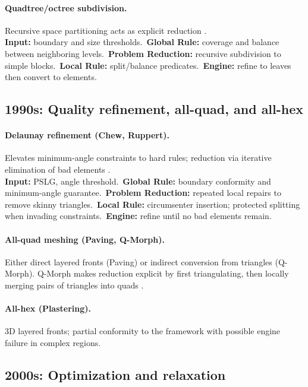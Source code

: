 \paragraph{Quadtree/octree subdivision.} Recursive space partitioning acts as explicit reduction \citep{yerry1983modified}.
\\\textbf{Input:} boundary and size thresholds.\
\textbf{Global Rule:} coverage and balance between neighboring levels.\
\textbf{Problem Reduction:} recursive subdivision to simple blocks.\
\textbf{Local Rule:} split/balance predicates.\
\textbf{Engine:} refine to leaves then convert to elements.

\subsection{1990s: Quality refinement, all-quad, and all-hex}
\paragraph{Delaunay refinement (Chew, Ruppert).} Elevates minimum-angle constraints to hard rules; reduction via iterative elimination of bad elements \citep{ruppert1995delaunay}.
\\\textbf{Input:} PSLG, angle threshold.\
\textbf{Global Rule:} boundary conformity and minimum-angle guarantee.\
\textbf{Problem Reduction:} repeated local repairs to remove skinny triangles.\
\textbf{Local Rule:} circumsenter insertion; protected splitting when invading constraints.\
\textbf{Engine:} refine until no bad elements remain.

\paragraph{All-quad meshing (Paving, Q-Morph).} Either direct layered fronts (Paving) or indirect conversion from triangles (Q-Morph). Q-Morph makes reduction explicit by first triangulating, then locally merging pairs of triangles into quads \citep{owen1998qmorph}.

\paragraph{All-hex (Plastering).} 3D layered fronts; partial conformity to the framework with possible engine failure in complex regions.

\subsection{2000s: Optimization and relaxation}
